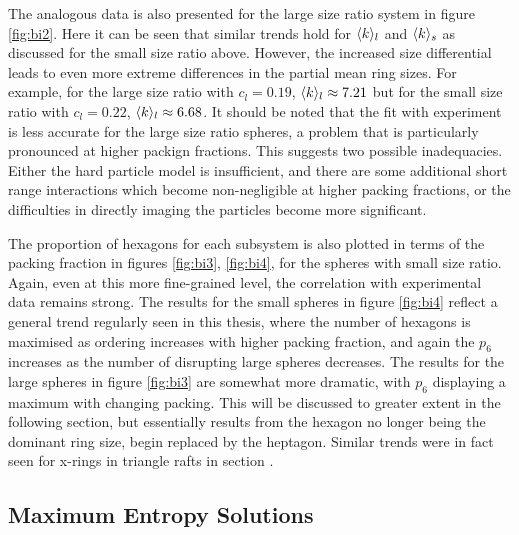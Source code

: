 The analogous data is also presented for the large size ratio system in figure \ref{fig:bi2}.
Here it can be seen that similar trends hold for $\langle k \rangle_l$ and $\langle k \rangle_s$ as discussed for the small size ratio above. 
However, the increased size differential leads to even more extreme differences in the partial mean ring sizes.
For example, for the large size ratio with $c_l=0.19$, $\langle k \rangle_l\approx7.21$ but for the small size ratio with $c_l=0.22$, $\langle k \rangle_l\approx6.68$.
It should be noted that the fit with experiment is less accurate for the large size ratio spheres, a problem that is particularly pronounced at higher packign fractions.
This suggests two possible inadequacies.
Either the hard particle model is insufficient, and there are some additional short range interactions which become non\--negligible at higher packing fractions, or the difficulties in directly imaging the particles become more significant. 

The proportion of hexagons for each subsystem is also plotted in terms of the packing fraction in figures \ref{fig:bi3}, \ref{fig:bi4}, for the spheres with small size ratio.
Again, even at this more fine\--grained level, the correlation with experimental data remains strong.
The results for the small spheres in figure \ref{fig:bi4} reflect a general trend regularly seen in this thesis, where the number of hexagons is maximised as ordering increases with higher packing fraction, and again the $p_6$ increases as the number of disrupting large spheres decreases.
The results for the large spheres in figure \ref{fig:bi3} are somewhat more dramatic, with $p_6$ displaying a maximum with changing packing.
This will be discussed to greater extent in the following section, but essentially results from the hexagon no longer being the dominant ring size, begin replaced by the heptagon.
Similar trends were in fact seen for x-rings in triangle rafts in section . 

\subsection{Maximum Entropy Solutions}

